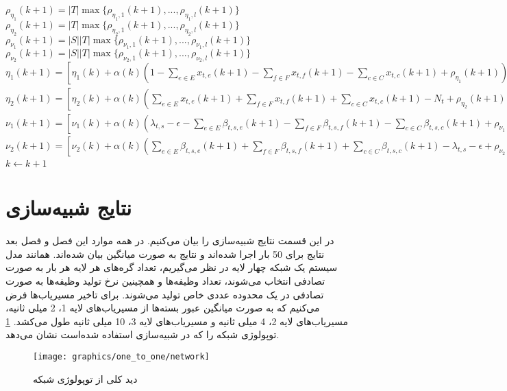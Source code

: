 	\begin{latin}
		\begin{algorithm}                     
			\begin{algorithmic} [1]              
				\State $\rho_{\eta_1}(k+1) = |T| \max \{ \rho_{\eta_1,1}(k+1), ..., \rho_{\eta_1,l}(k+1)\}$
				\State $\rho_{\eta_2}(k+1) = |T| \max \{ \rho_{\eta_2,1}(k+1), ..., \rho_{\eta_2,l}(k+1)\}$
				\State $\rho_{\nu_1}(k+1) = |S||T| \max \{ \rho_{\nu_1,1}(k+1), ..., \rho_{\nu_1,l}(k+1)\}$
				\State $\rho_{\nu_2}(k+1) = |S||T| \max \{ \rho_{\nu_2,1}(k+1), ..., \rho_{\nu_2,l}(k+1)\}$
				\State $\eta_1(k+1) = [\eta_1(k) + \alpha(k)(1-\sum_{e \in E}x_{t,e}(k+1) - \sum_{f \in F}x_{t,f}(k+1) - \sum_{c \in C}x_{t,c}(k+1)+\rho_{\eta_1}(k+1))]_+$
				\State $\eta_2(k+1) = [\eta_2(k) + \alpha(k)(\sum_{e \in E}x_{t,e}(k+1) + \sum_{f \in F}x_{t,f}(k+1) + \sum_{c \in C}x_{t,c}(k+1) - N_t +\rho_{\eta_2}(k+1))]_+$
				\State $\nu_1(k+1) = [\nu_1(k) + \alpha(k)( \lambda_{t,s} - \epsilon - \sum_{e \in E}\beta_{t,s,e}(k+1) - \sum_{f \in F}\beta_{t,s,f}(k+1) - \sum_{c \in C}\beta_{t,s,c}(k+1) +\rho_{\nu_1}(k+1))]_+$
				\State $\nu_2(k+1) = [\nu_2(k) + \alpha(k)( \sum_{e \in E}\beta_{t,s,e}(k+1) + \sum_{f \in F}\beta_{t,s,f}(k+1) + \sum_{c \in C}\beta_{t,s,c}(k+1) -\lambda_{t,s} - \epsilon + \rho_{\nu_2}(k+1))]_+$
				\State $k \gets k+1$ 
			\EndProcedure
		\end{algorithmic}
	\end{algorithm}
\end{latin}


\section{نتایج شبیه‌سازی}
	در این قسمت نتایج شبیه‌سازی را بیان می‌کنیم. در همه موارد این فصل و فصل بعد نتایج برای 50 بار اجرا شده‌اند و نتایج به صورت میانگین بیان شده‌اند. همانند مدل سیستم یک شبکه چهار لایه در نظر می‌گیریم، تعداد گره‌های هر لایه هر بار به صورت تصادفی انتخاب می‌شوند، تعداد وظیفه‌ها و همچینین نرخ تولید وظیفه‌ها به صورت تصادفی در یک محدوده عددی خاص تولید می‌شوند. 
    برای تاخیر مسیریاب‌ها فرض می‌کنیم که به صورت میانگین عبور بسته‌ها از مسیریاب‌های لایه 1، 2 میلی ثانیه، مسیریاب‌های لایه 2، 4 میلی ثانیه و مسیریاب‌های لایه 3، 10 میلی ثانیه طول می‌کشد.
\cref{fig:network} توپولوژی شبکه را که در شبیه‌سازی استفاده شده‌است نشان می‌دهد.

\begin{figure}[h]
	\centerline{\texttt{[image: graphics/one\_to\_one/network]}}
	\caption{دید کلی از توپولوژی شبکه}
	\label{fig:network}
\end{figure}

